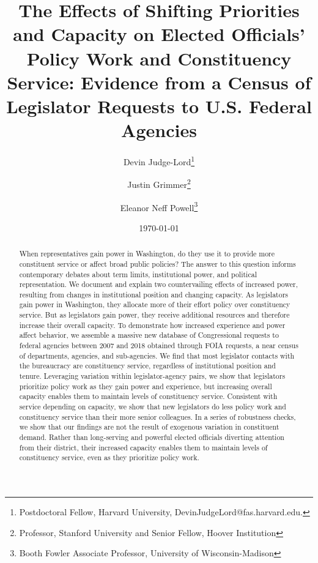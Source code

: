 \documentclass[12pt]{article}
\title{The Effects of Shifting Priorities and Capacity on Elected Officials' Policy Work and Constituency Service: Evidence from a Census of Legislator Requests to U.S. Federal Agencies}
\author{Devin Judge-Lord\thanks{Postdoctoral Fellow, Harvard University, DevinJudgeLord@fas.harvard.edu.}\and Justin Grimmer\thanks{Professor, Stanford University and Senior Fellow, Hoover Institution} \and Eleanor Neff Powell\thanks{Booth Fowler Associate Professor, University of Wisconsin-Madison}}
\date{\today}
\begin{document}
\maketitle




\begin{abstract}
\noindent 


\noindent When representatives gain power in Washington, do they use it to provide more constituent service or affect broad public policies? The answer to this question informs contemporary debates about term limits, institutional power, and political representation.  We document and explain two countervailing effects of increased power, resulting from changes in institutional position and changing capacity.  As legislators gain power in Washington, they allocate more of their effort policy over constituency service. But as legislators gain power, they receive additional resources and therefore increase their overall capacity. To demonstrate how increased experience and power affect behavior, we assemble a massive new database of  Congressional requests to federal agencies between 2007 and 2018 obtained through FOIA requests, a near census of departments, agencies, and sub-agencies. We find that most legislator contacts with the bureaucracy are constituency service, regardless of institutional position and tenure. Leveraging variation within legislator-agency pairs, we show that legislators prioritize policy work as they gain power and experience, but increasing overall capacity enables them to maintain levels of constituency service. Consistent with service depending on capacity, we show that new legislators do less policy work and constituency service than their more senior colleagues. In a series of robustness checks, we show that our findings are not the result of exogenous variation in constituent demand. Rather than long-serving and powerful elected officials diverting attention from their district,  their increased capacity enables them to maintain levels of constituency service, even as they prioritize policy work.
   



\end{abstract}
\end{document}
